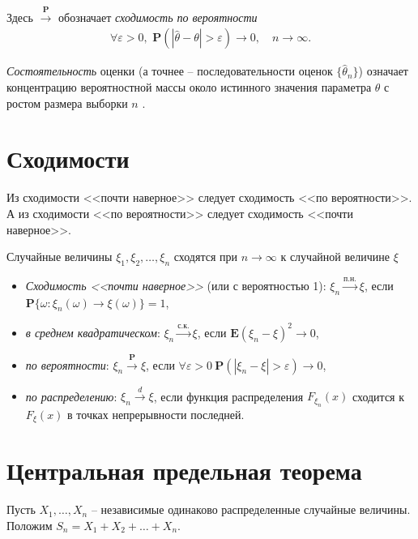 \documentclass[%
	11pt,
	a4paper,
	utf8,
		]{article}
\begin{document}
Здесь $ \xrightarrow{\mathbf{P}} $ обозначает \emph{сходимость по вероятности}
\begin{align*}
	\forall \varepsilon > 0, \,\, \mathbf{P}( | \hat{\theta} - \theta | > \varepsilon ) \to 0, \quad n \to \infty.
\end{align*}

\emph{Состоятельность} оценки (а точнее -- последовательности оценок $ \{\hat{\theta}_n\} $) означает концентрацию вероятностной массы около истинного значения параметра $ \theta $ с ростом размера выборки $ n $ \cite[75]{lagutin:2009}.

\section{Сходимости}

Из сходимости <<почти наверное>> следует сходимость <<по вероятности>>. А из сходимости <<по вероятности>> следует сходимость <<почти наверное>>.

Случайные величины $ \xi_1, \xi_2, \ldots, \xi_n $ сходятся при $ n \to \infty $ к случайной величине $ \xi $
\begin{itemize}
	\item \emph{Сходимость <<почти наверное>>} (или с вероятностью 1): $ \xi_n \xrightarrow{\text{п.н.}} \xi $, если $ \mathbf{P}\{ \omega: \xi_n(\omega) \to \xi(\omega) \} = 1 $,
	
	\item \emph{в среднем квадратическом}: $ \xi_n \xrightarrow{\text{с.к.}} \xi $, если $ \mathbf{E}(\xi_n - \xi)^2 \to 0 $,
	
	\item \emph{по вероятности}: $ \xi_n \xrightarrow{\mathbf{P}} \xi $, если $ \forall \varepsilon > 0 \ \mathbf{P}(| \xi_n - \xi | > \varepsilon) \to 0 $, 
	
	\item \emph{по распределению}: $ \xi_n \xrightarrow{d} \xi $, если функция распределения $ F_{\xi_n}(x) $ сходится к $ F_{\xi}(x) $ в точках непрерывности последней.
\end{itemize}



\section{Центральная предельная теорема}

Пусть $ X_1,\dots, X_n $ -- независимые одинаково распределенные случайные величины. Положим $ S_n = X_1 + X_2 + \dots + X_n $.
\end{document}
